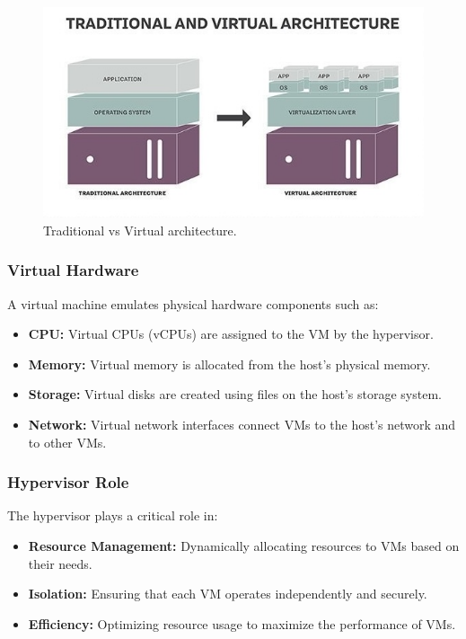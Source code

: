 \begin{figure}
    \begin{center}
        \includegraphics[width=\textwidth]{images/virtualization.jpg}
        \caption{Traditional vs Virtual architecture.}
        \label{fig:virtualization}
    \end{center}
\end{figure}


\subsubsection{Virtual Hardware}
A virtual machine emulates physical hardware components such as:
\begin{itemize}
    \item \textbf{CPU:} Virtual CPUs (vCPUs) are assigned to the VM by the hypervisor.
    \item \textbf{Memory:} Virtual memory is allocated from the host's physical memory.
    \item \textbf{Storage:} Virtual disks are created using files on the host's storage system.
    \item \textbf{Network:} Virtual network interfaces connect VMs to the host's network and to other VMs.
\end{itemize}

\subsubsection{Hypervisor Role}
The hypervisor plays a critical role in:
\begin{itemize}
    \item \textbf{Resource Management:} Dynamically allocating resources to VMs based on their needs.
    \item \textbf{Isolation:} Ensuring that each VM operates independently and securely.
    \item \textbf{Efficiency:} Optimizing resource usage to maximize the performance of VMs.
\end{itemize}

